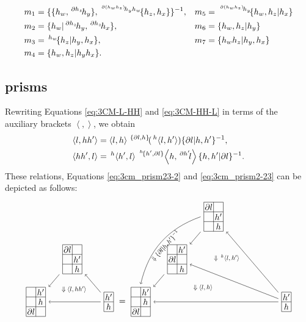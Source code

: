 \documentclass[11pt, reqno]{amsart} %
\newcommand{\act}[1]{\,\sp{#1}\!}
\newcommand{\strsquare}[4][]{
  \begin{scope}[every node/.append style={overlay},#1]
    \foreach \x [count=\i] in {#4}{
      \ifx\x\empty
      \else
        \pgfmathsetmacro{\modResult}{mod(\i-1, #2)}
        \pgfmathsetmacro{\quotResult}{(\i-\modResult-1)/#2}
        \node at (\modResult,-\quotResult) {\x};
      \fi
    }
    \foreach \x in {0,1,...,#2}{
      \draw ({-1/2+\x},{1/2})--({-1/2+\x},{-#3+1/2});
    }
    \foreach \y in {0,1,...,#3}{
      \draw ({-1/2},{1/2-\y})--({#2-1/2},{1/2-\y});
    }
  \end{scope}
}
\theoremstyle{definition}
\theoremstyle{remark}
\numberwithin{equation}{section}
\begin{document}
\begin{align*}
  m_1 &= \{\{h_w,\act{\partial h_z}h_y\},\act{\act{\partial (h_wh_z)}h_yh_w}\{h_z,h_x\}\}^{-1}, & 
  m_5 &= \act{\act{\partial (h_wh_z)}h_y}\{h_w,h_z|h_x\} \\
  m_2 &= \{h_w|\act{\partial h_z}h_y,\act{\partial h_z}h_x\}, & 
  m_6 &= \{h_w,h_z|h_y\} \\
  m_3 &= \act{h_w}\{h_z|h_y,h_x\}, & 
  m_7 &= \{h_wh_z|h_y,h_x\} \\
  m_4 &= \{h_w,h_z|h_yh_x\}.
\end{align*}

\subsection{prisms}
Rewriting Equations \eqref{eq:3CM-L-HH} and \eqref{eq:3CM-HH-L} in terms of the auxiliary brackets $\left<,\right>$, we obtain
\begin{align}
  \left<l,hh'\right> &= \left<l,h\right>\act{\{\partial l,h\}}(\act{h}\left<l,h'\right>)\{\partial l|h,h'\}^{-1}, \\
  \label{eq:3CM-aux-HH-L}
  \left<hh',l\right> &= \act{h}\left<h',l\right>\act{\act{h}\{h',\partial l\}}\left<h,\act{\partial h'}l\right>\{h,h'|\partial l\}^{-1}.
\end{align}
These relations, Equations \eqref{eq:3cm_prism23-2} and \eqref{eq:3cm_prism2-23} can be depicted as follows:
\[
  \begin{tikzpicture}[baseline=-2pt]
    \node (A) at (1.5,0) {\tikz[baseline=-2pt,scale=.4]{\strsquare{1}{2}{$h'$,$h$}}};
    \node (B) at (0,1.75) {\tikz[baseline=-2pt,scale=.4]{\strsquare{2}{3}{$\partial l$,,,$h'$,,$h$}}};
    \node (C) at (-1.5,0) {\tikz[baseline=-2pt,scale=.4]{\strsquare{2}{3}{,$h'$,,$h$,$\partial l$,}}};
    \draw [->] (A) to (B);
    \draw [->] (B) to (C);
    \draw [->] (A) to coordinate (D) (C);
    \path (B) to node [transform shape,scale=.75] {$\Downarrow \left<l,hh'\right>$} (D);
  \end{tikzpicture}
  =
  \begin{tikzpicture}[baseline=-2pt]
    \node (A) at (3,0) {\tikz[baseline=-2pt,scale=.4]{\strsquare{1}{2}{$h'$,$h$}}};
    \node (B) at (0,3.5) {\tikz[baseline=-2pt,scale=.4]{\strsquare{2}{3}{$\partial l$,,,$h'$,,$h$}}};
    \node (C) at (-1.5,1.75) {\tikz[baseline=-2pt,scale=.4]{\strsquare{2}{3}{,$h'$,$\partial l$,,,$h$}}};
    \node (D) at (-3,0) {\tikz[baseline=-2pt,scale=.4]{\strsquare{2}{3}{,$h'$,,$h$,$\partial l$,}}};
    \draw [->] (A) to (B);
    \draw [->,bend right=1cm] (B.west) to node [transform shape,scale=.75,sloped,anchor=north] {$\Downarrow \{\partial l|h,h'\}^{-1}$} (D.north);
    \draw [->] (B) to (C);
    \draw [->] (C) to (D);
    \draw [->] (A) to coordinate (E) (D);
    \draw [->] (A) to coordinate (F) (C);
    \path (B) to node [transform shape,scale=.75] {$\Downarrow \act{h}\left<l,h'\right>$} (F);
    \path (C) to node [transform shape,scale=.75] {$\Downarrow \left<l,h\right>$} (E);
  \end{tikzpicture}
\]
\end{document}
